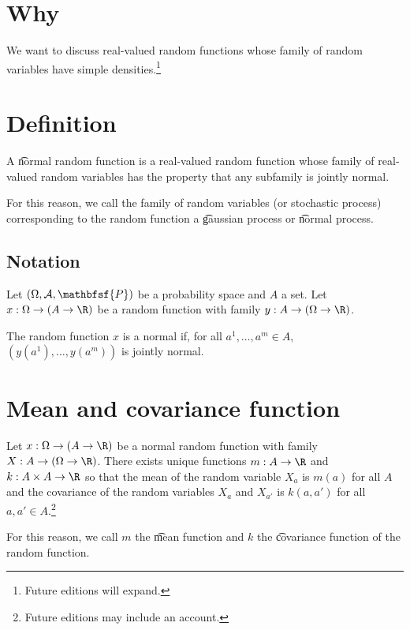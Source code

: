 

\section*{Why}

We want to discuss real-valued random functions whose family of random variables have simple densities.\footnote{Future editions will expand.}

\section*{Definition}

A \t{normal random function} is a real-valued random function whose family of real-valued random variables has the property that any subfamily is jointly normal.

For this reason, we call the family of random variables (or stochastic process) corresponding to the random function a \t{gaussian process} or \t{normal process}.

  \subsection*{Notation}

Let $(\Omega , \mathcal{A} , \mathbfsf{P} )$ be a probability space and $A$ a set.
Let $x: \Omega  \to (A \to \R )$ be a random function with family $y: A \to (\Omega  \to \R )$.

The random function $x$ is a normal if, for all $a^1, \dots , a^m \in A$, $(y(a^1), \dots , y(a^m))$ is jointly normal.

  \section*{Mean and covariance function}

\begin{proposition}
Let $x: \Omega  \to (A \to \R )$ be a normal random function with family $X: A \to (\Omega  \to \R )$.
There exists unique functions $m: A \to \R $ and $k: A \times A \to \R $ so that the mean of the random variable $X_a$ is $m(a)$ for all $A$ and the covariance of the random variables $X_a$ and $X_{a'}$ is $k(a, a')$ for all $a, a' \in A$.\footnote{Future editions may include an account.}\end{proposition}
For this reason, we call $m$ the \t{mean function} and $k$ the \t{covariance function} of the random function.

